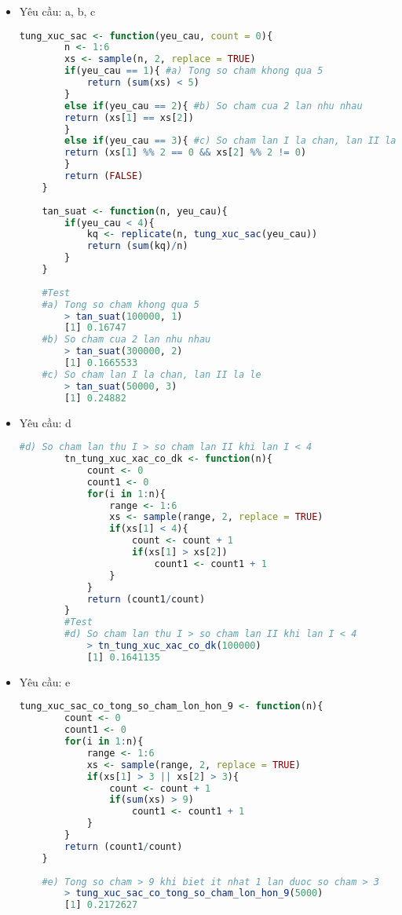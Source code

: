 \documentclass[a4paper,12pt]{article}
\begin{document}
\begin{itemize}
	\item Yêu cầu: a, b, c \\
	\begin{lstlisting}[language=R]
	tung_xuc_sac <- function(yeu_cau, count = 0){
		n <- 1:6
		xs <- sample(n, 2, replace = TRUE)
		if(yeu_cau == 1){ #a) Tong so cham khong qua 5
			return (sum(xs) < 5)
		}
		else if(yeu_cau == 2){ #b) So cham cua 2 lan nhu nhau
		return (xs[1] == xs[2])  
		}
		else if(yeu_cau == 3){ #c) So cham lan I la chan, lan II la le
		return (xs[1] %% 2 == 0 && xs[2] %% 2 != 0)
		}
		return (FALSE)
	}
	
	tan_suat <- function(n, yeu_cau){
		if(yeu_cau < 4){
			kq <- replicate(n, tung_xuc_sac(yeu_cau))
			return (sum(kq)/n)
		}
	}
	
	#Test
	#a) Tong so cham khong qua 5
		> tan_suat(100000, 1)
		[1] 0.16747
	#b) So cham cua 2 lan nhu nhau
		> tan_suat(300000, 2)
		[1] 0.1665533
	#c) So cham lan I la chan, lan II la le
		> tan_suat(50000, 3)
		[1] 0.24882
	\end{lstlisting}
	
	\item Yêu cầu: d \\
	\begin{lstlisting}[language=R]
		#d) So cham lan thu I > so cham lan II khi lan I < 4
		tn_tung_xuc_xac_co_dk <- function(n){
			count <- 0
			count1 <- 0
			for(i in 1:n){
				range <- 1:6
				xs <- sample(range, 2, replace = TRUE)
				if(xs[1] < 4){
					count <- count + 1
					if(xs[1] > xs[2])
						count1 <- count1 + 1
				}
			}
			return (count1/count)
		}
		#Test
		#d) So cham lan thu I > so cham lan II khi lan I < 4
			> tn_tung_xuc_xac_co_dk(100000)
			[1] 0.1641135
	\end{lstlisting}
	\item Yêu cầu: e\\
	\begin{lstlisting}[language=R]
	tung_xuc_sac_co_tong_so_cham_lon_hon_9 <- function(n){
		count <- 0
		count1 <- 0
		for(i in 1:n){
			range <- 1:6
			xs <- sample(range, 2, replace = TRUE)
			if(xs[1] > 3 || xs[2] > 3){
				count <- count + 1
				if(sum(xs) > 9)
					count1 <- count1 + 1
			}
		}
		return (count1/count)
	}
	
	#e) Tong so cham > 9 khi biet it nhat 1 lan duoc so cham > 3
		> tung_xuc_sac_co_tong_so_cham_lon_hon_9(5000)
		[1] 0.2172627
	\end{lstlisting}
	
\end{itemize}	
	
\end{document}
